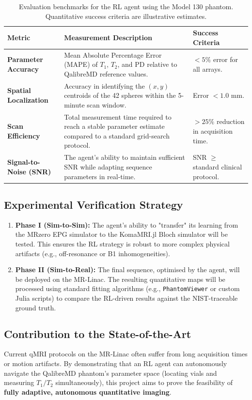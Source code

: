 \begin{table}[htbp]
\centering
\begin{tabularx}{\linewidth}{|>{\raggedright\arraybackslash}p{3.7cm}|X|>{\raggedright\arraybackslash}p{3.2cm}|}
\hline
\textbf{Metric} & \textbf{Measurement Description} & \textbf{Success Criteria} \\ \hline
\textbf{Parameter Accuracy} & Mean Absolute Percentage Error (MAPE) of $T_1$, $T_2$, and PD relative to QalibreMD reference values. & $< 5\%$ error for all arrays. \\ \hline
\textbf{Spatial Localization} & Accuracy in identifying the $(x, y)$ centroids of the 42 spheres within the 5-minute scan window. & Error $< 1.0$ mm. \\ \hline
\textbf{Scan Efficiency} & Total measurement time required to reach a stable parameter estimate compared to a standard grid-search protocol. & $> 25\%$ reduction in acquisition time. \\ \hline
\textbf{Signal-to-Noise (SNR)} & The agent's ability to maintain sufficient SNR while adapting sequence parameters in real-time. & SNR $\geq$ standard clinical protocol. \\ \hline
\end{tabularx}
\caption{Evaluation benchmarks for the RL agent using the Model 130 phantom. Quantitative success criteria are illustrative estimates.}
\end{table}

\subsection{Experimental Verification Strategy}
\begin{enumerate}
    \item \textbf{Phase I (Sim-to-Sim):} The agent’s ability to "transfer" its learning from the MRzero EPG simulator to the KomaMRI.jl Bloch simulator will be tested. This ensures the RL strategy is robust to more complex physical artifacts (e.g., off-resonance or B1 inhomogeneities).
    \item \textbf{Phase II (Sim-to-Real):} The final sequence, optimised by the agent, will be deployed on the MR-Linac. The resulting quantitative maps will be processed using standard fitting algorithms (e.g., \texttt{PhantomViewer} or custom Julia scripts) to compare the RL-driven results against the NIST-traceable ground truth.
\end{enumerate}

\subsection{Contribution to the State-of-the-Art}
Current qMRI protocols on the MR-Linac often suffer from long acquisition times or motion artifacts. By demonstrating that an RL agent can autonomously navigate the QalibreMD phantom's parameter space (locating vials and measuring $T_1/T_2$ simultaneously), this project aims to prove the feasibility of \textbf{fully adaptive, autonomous quantitative imaging}.


